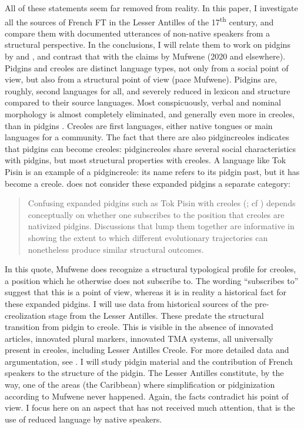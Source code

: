 \documentclass[output=paper,colorlinks,citecolor=brown]{langscibook}
\begin{document}
All of these statements seem far removed from reality.
In this paper, I investigate all the sources of French FT in the Lesser Antilles of the 17\textsuperscript{th} century, and compare them with documented utterances of non-native speakers from a structural perspective. In the conclusions, I will relate them to work on pidgins by \citet{Avram2017} and \citet{Parkvall2017}, and contrast that with the claims by Mufwene (2020 and elsewhere).
Pidgins and creoles are distinct language types, not only from a social point of view, but also from a structural point of view (pace Mufwene). Pidgins are, roughly, second languages for all, and severely reduced in lexicon and structure compared to their source languages. Most conspicuously, verbal and nominal morphology is almost completely eliminated, and generally even more in creoles, than in pidgins \citep{Bakker2003}. Creoles are first languages, either native tongues or main languages for a community. The fact that there are also pidgincreoles \citep{Bakker2008} indicates that pidgins can become creoles: pidgincreoles share several social characteristics with pidgins, but most structural properties with creoles. A language like Tok Pisin is an example of a pidgincreole: its name refers to its pidgin past, but it has become a creole. \citet[138]{Mufwene2015} does not consider these expanded pidgins a separate category: 

\begin{quote}
Confusing expanded pidgins such as Tok Pisin with creoles (\citealt{Thomason2001}; cf \citealt{Siegel2008}) depends conceptually on whether one subscribes to the position that creoles are nativized pidgins. Discussions that lump them together are informative in showing the extent to which different evolutionary trajectories can nonetheless produce similar structural outcomes.
\end{quote}

In this quote, Mufwene does recognize a structural typological profile for creoles, a position which he otherwise does not subscribe to. The wording “subscribes to” suggest that this is a point of view, whereas it is in reality a historical fact for these expanded pidgins.
I will use data from historical sources of the pre-creolization stage from the Lesser Antilles. These predate the structural transition from pidgin to creole. This is visible in the absence of innovated articles, innovated plural markers, innovated TMA systems, all universally present in creoles, including Lesser Antilles Creole. For more detailed data and argumentation, see \citet{Bakker2022}.
I will study pidgin material and the contribution of French speakers to the structure of the pidgin. The Lesser Antilles constitute, by the way, one of the areas (the Caribbean) where simplification or pidginization according to Mufwene never happened. Again, the facts contradict his point of view. I focus here on an aspect that has not received much attention, that is the use of reduced language by native speakers.
\end{document}

